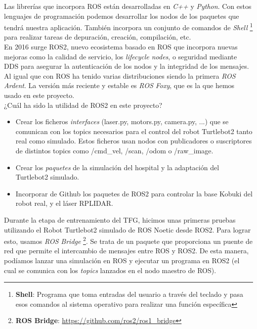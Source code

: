 Las librerías que incorpora ROS están desarrolladas en \textit{C++} y \textit{Python}. Con estos lenguajes de programación podemos desarrollar los nodos de los paquetes que tendrá nuestra aplicación. También incorpora un conjunto de comandos de \textit{Shell} \footnote{\textbf{Shell}: Programa que toma entradas del usuario a través del teclado y pasa esos comandos al sistema operativo para realizar una función específica} para realizar tareas de depuración, creación, compilación, etc.\\

En 2016 surge ROS2, nuevo ecosistema basado en ROS que incorpora nuevas mejoras como la calidad de servicio, los \textit{lifecycle nodes}, o seguridad mediante DDS para asegurar la autenticación de los nodos y la integridad de los mensajes. Al igual que con ROS ha tenido varias distribuciones siendo la primera \textit{ROS Ardent}. La versión más reciente y estable es \textit{ROS Foxy}, que es la que hemos usado en este proyecto.\\

¿Cuál ha sido la utilidad de ROS2 en este proyecto?
\begin{itemize}
	\item Crear los ficheros \textit{interfaces} (laser.py, motors.py, camera.py, ...) que se comunican con los topics necesarios para el control del robot Turtlebot2 tanto real como simulado. Estos ficheros usan nodos con publicadores o suscriptores de distintos topics como /cmd\_vel, /scan, /odom o /raw\_image.
	\item Crear los \textit{paquetes} de la simulación del hospital y la adaptación del Turtlebot2 simulado.
	\item Incorporar de Github los paquetes de ROS2 para controlar la base Kobuki del robot real, y el láser RPLIDAR.
\end{itemize}

Durante la etapa de entrenamiento del TFG, hicimos unas primeras pruebas utilizando el Robot Turtlebot2 simulado de ROS Noetic desde ROS2. Para lograr esto, usamos \textit{ROS Bridge} \footnote{\textbf{ROS Bridge}: \url{https://github.com/ros2/ros1_bridge}}. Se trata de un paquete que proporciona un puente de red que permite el intercambio de mensajes entre ROS y ROS2. De esta manera, podíamos lanzar una simulación en ROS y ejecutar un programa en ROS2 (el cual se comunica con los \textit{topics} lanzados en el nodo maestro de ROS).\\




